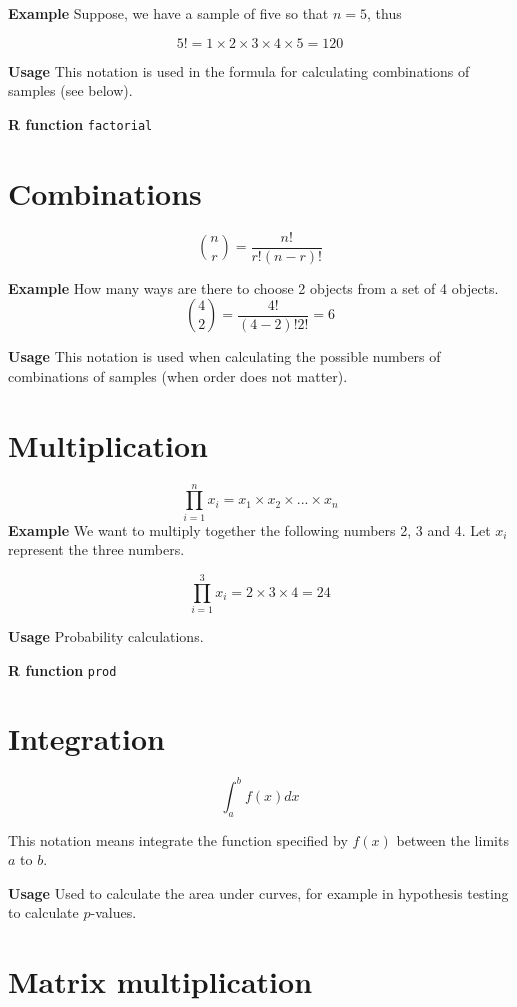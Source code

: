 \documentclass[
  oneside]{krantz}
\begin{document}
\textbf{Example} Suppose, we have a sample of five so that \(n = 5\), thus

\[5! = 1 \times 2 \times 3 \times 4 \times 5 = 120 \]

\textbf{Usage} This notation is used in the formula for calculating combinations of samples (see below).

\textbf{R function} \texttt{factorial}

\hypertarget{combinations}{%
\section{Combinations}\label{combinations}}

\[{n \choose r} = \frac{n!}{r!(n-r)!} \]

\textbf{Example} How many ways are there to choose 2 objects from a set of 4 objects.
\[{4 \choose 2} = \frac{4!}{(4-2)!2!} = 6\]

\textbf{Usage} This notation is used when calculating the possible numbers of combinations of samples (when order does not matter).

\hypertarget{multiplication}{%
\section{Multiplication}\label{multiplication}}

\[\prod_{i=1} ^{n} x_i = x_1 \times x_2 \times ...\times x_n\]
\textbf{Example} We want to multiply together the following numbers 2, 3 and 4. Let \(x_i\) represent the three numbers.

\[\prod_{i=1} ^{3} x_i = 2 \times 3 \times 4 = 24\]

\textbf{Usage} Probability calculations.

\textbf{R function} \texttt{prod}

\hypertarget{integration}{%
\section{Integration}\label{integration}}

\[\int_a^b f(x) dx \]

This notation means integrate the function specified by \(f(x)\) between the limits \(a\) to \(b\).

\textbf{Usage} Used to calculate the area under curves, for example in hypothesis testing to calculate \(p\)-values.

\hypertarget{matrix-multiplication}{%
\section{Matrix multiplication}\label{matrix-multiplication}}
\end{document}
